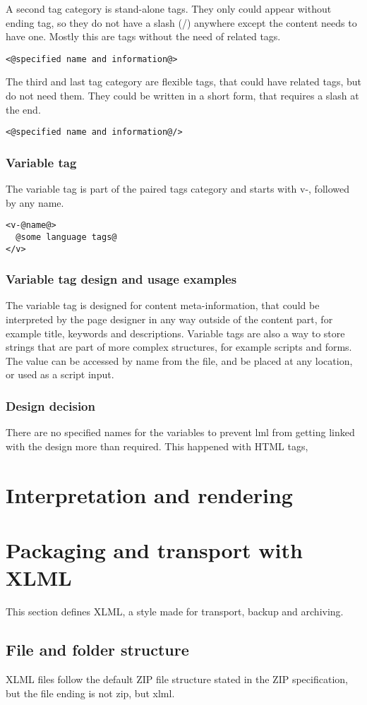 \documentclass[12pt,a4paper]{article}
\begin{document}
A second tag category is stand-alone tags. They only could appear without ending tag, so they do not have a slash (/) anywhere except the content needs to have one. Mostly this are tags without the need of related tags.
\begin{lstlisting}[frame=single,style=base]
<@specified name and information@>
\end{lstlisting}

The third and last tag category are flexible tags, that could have related tags, but do not need them. They could be written in a short form, that requires a slash at the end.
\begin{lstlisting}[frame=single,style=base]
<@specified name and information@/>
\end{lstlisting}

\subsubsection*{Variable tag}
The variable tag is part of the paired tags category and starts with v-, followed by any name.
\begin{lstlisting}[frame=single,style=base]
<v-@name@>
  @some language tags@
</v>
\end{lstlisting}

\begin{tcolorbox}
\subsubsection*{Variable tag design and usage examples}
The variable tag is designed for content meta-information, that could be interpreted by the page designer in any way outside of the content part, for example title, keywords and descriptions. Variable tags are also a way to store strings that are part of more complex structures, for example scripts and forms. The value can be accessed by name from the file, and be placed at any location, or used as a script input.

\subsubsection*{Design decision}
There are no specified names for the variables to prevent lml from getting linked with the design more than required. This happened with HTML tags, 
\end{tcolorbox}

\section{Interpretation and rendering}

\section{Packaging and transport with XLML}

This section defines XLML, a style made for transport, backup and archiving.

\subsection{File and folder structure}

XLML files follow the default ZIP file structure stated in the ZIP specification, but the file ending is not zip, but xlml.
\end{document}
